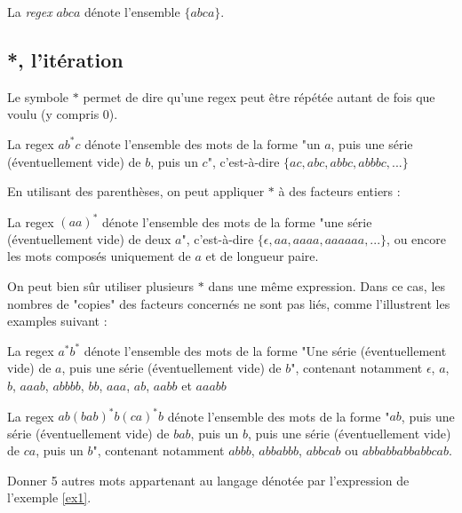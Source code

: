 \begin{example}
La \textit{regex} $abca$ dénote l'ensemble $\{abca\}$.
\end{example}


\subsection{*, l'itération}

Le symbole $*$ permet de dire qu'une regex peut être répétée autant de fois que voulu (y compris 0). 

\begin{example}
La regex $ab^*c$ dénote l'ensemble des mots de la forme "un $a$, puis une série (éventuellement vide) de $b$, puis un $c$", c'est-à-dire $\{ac, abc, abbc, abbbc, ...\}$
\end{example}

En utilisant des parenthèses, on peut appliquer $*$ à des facteurs entiers :

\begin{example}
La regex $(aa)^*$ dénote l'ensemble des mots de la forme "une série (éventuellement vide) de deux $a$", c'est-à-dire $\{\epsilon, aa, aaaa, aaaaaa, ...\}$, ou encore les mots composés uniquement de $a$ et de longueur paire.
\end{example}

On peut bien sûr utiliser plusieurs $*$ dans une même expression. Dans ce cas, les nombres de "copies" des facteurs concernés ne sont pas liés, comme l'illustrent les examples suivant :


\begin{example}
\label{ex0}
La regex $a^*b^*$ dénote l'ensemble des mots de la forme "Une série (éventuellement vide) de $a$, puis une série (éventuellement vide) de $b$", contenant notamment $\epsilon$, $a$, $b$, $aaab$, $abbbb$, $bb$, $aaa$, $ab$, $aabb$ et $aaabb$
\end{example}

\begin{example}
\label{ex1}
La regex $ab(bab)^*b(ca)^*b$ dénote l'ensemble des mots de la forme "$ab$, puis une série (éventuellement vide) de $bab$, puis un $b$, puis une série (éventuellement vide) de $ca$, puis un $b$", contenant notamment $abbb$, $abbabbb$, $abbcab$ ou $abbabbabbabbcab$.
\end{example}

\begin{exercice}
Donner 5 autres mots appartenant au langage dénotée par l'expression de l'exemple \ref{ex1}. 
\end{exercice}


